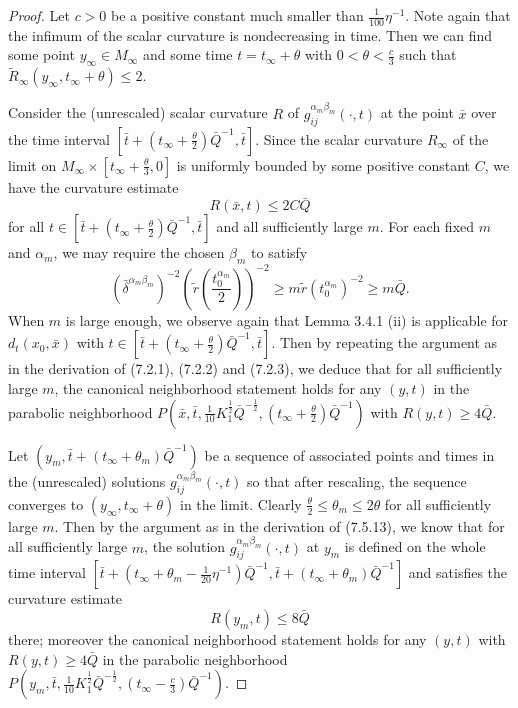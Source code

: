 \begin{proof}
Let $c>0$ be a positive constant much smaller than
$\frac{1}{100}\eta^{-1}$. Note again that the infimum of the
scalar curvature is nondecreasing in time. Then we can find some
point $y_{\infty} \in M_{\infty}$ and some time $t=t_{\infty} +
\theta$ with $0<\theta<\frac{c}{3}$ such that
$\widetilde{R}_{\infty}(y_{\infty},t_{\infty}+\theta) \leq 2$.

Consider the (unrescaled) scalar curvature $R$ of
${g}_{ij}^{\alpha_m \beta_m}(\cdot,t)$ at the point $\bar x$ over
the time interval $[\bar
t+(t_{\infty}+\frac{\theta}{2})\bar{Q}^{-1},\bar t]$. Since the
scalar curvature $R_{\infty}$ of the limit on $M_{\infty}\times
[t_{\infty}+\frac{\theta}{3},0]$ is uniformly bounded by some
positive constant $C$, we have the curvature estimate
$$
R(\bar x,t) \leq 2C\bar{Q}
$$
for all $t \in [\bar
t+(t_{\infty}+\frac{\theta}{2})\bar{Q}^{-1},\bar t]$ and all
sufficiently large $m$. For each fixed $m$ and $\alpha_m$, we may
require the chosen $\beta_m$ to satisfy
$$
(\bar{\delta}^{\alpha_m\beta_m})^{-2}\left(\widetilde{r}
\left(\frac{t^{\alpha_m}_0}{2}\right)\right)^{-2} \geq
m\widetilde{r}({t^{\alpha_m}_0})^{-2}\geq m\bar{Q}.
$$
When $m$ is large enough, we observe again that Lemma 3.4.1 (ii)
is applicable for $d_t(x_0,\bar{x})$ with $t \in [\bar
t+(t_{\infty}+\frac{\theta}{2})\bar{Q}^{-1},\bar t]$. Then by
repeating the argument as in the derivation of (7.2.1), (7.2.2)
and (7.2.3), we deduce that for all sufficiently large $m$, the
canonical neighborhood statement holds for any $(y,t)$ in the
parabolic neighborhood $P(\bar x,\bar
t,\frac{1}{10}K_1^{\frac{1}{2}}\bar{Q}^{-\frac{1}{2}},
(t_{\infty}+\frac{\theta}{2})\bar{Q}^{-1})$ with $R(y,t) \geq
4\bar{Q}$.

Let $(y_m,\bar t+(t_{\infty}+\theta_m)\bar{Q}^{-1})$ be a sequence
of associated points and times in the (unrescaled) solutions
$g_{ij}^{\alpha_m \beta_m}(\cdot,t)$ so that after rescaling, the
sequence converges to $(y_{\infty},t_{\infty}+\theta)$ in the
limit. Clearly $\frac{\theta}{2}\leq \theta_m \leq 2\theta$ for
all sufficiently large $m$. Then by the argument as in the
derivation of (7.5.13), we know that for all sufficiently large
$m$, the solution $g_{ij}^{\alpha_m \beta_m}(\cdot,t)$ at $y_m$ is
defined on the whole time interval $[\bar
t+(t_{\infty}+\theta_m-\frac{1}{20}\eta^{-1})\bar{Q}^{-1}, \bar
t+(t_{\infty}+\theta_m)\bar{Q}^{-1}]$ and satisfies the curvature
estimate
$$
R(y_m,t) \leq 8\bar{Q}
$$
there; moreover the canonical neighborhood statement holds for any
$(y,t)$ with $R(y,t) \geq 4\bar Q$ in the parabolic neighborhood
$P(y_m,\bar t,\frac{1}{10}K_1^{\frac{1}{2}}\bar{Q}^{-\frac{1}{2}},
(t_{\infty}-\frac{c}{3})\bar{Q}^{-1}).$


\end{proof}

